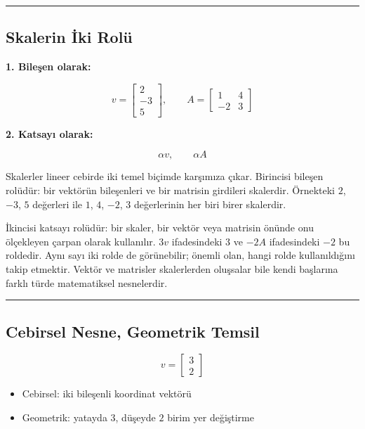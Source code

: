 \documentclass[
  a4paper,
  DIV=11,
  numbers=noendperiod]{scrartcl}
\providecommand{\tightlist}{%
  \setlength{\itemsep}{0pt}\setlength{\parskip}{0pt}}
\begin{document}
\begin{center}\rule{0.5\linewidth}{0.5pt}\end{center}

\subsection{Skalerin İki Rolü}\label{skalerin-iki-roluxfc}

\textbf{1. Bileşen olarak:}

\[
v=\begin{bmatrix}2\\-3\\5\end{bmatrix},
\qquad
A=\begin{bmatrix}1&4\\-2&3\end{bmatrix}
\]

\textbf{2. Katsayı olarak:}

\[
\alpha v,\qquad \alpha A
\]

Skalerler lineer cebirde iki temel biçimde karşımıza çıkar. Birincisi
bileşen rolüdür: bir vektörün bileşenleri ve bir matrisin girdileri
skalerdir. Örnekteki \(2\), \(-3\), \(5\) değerleri ile \(1\), \(4\),
\(-2\), \(3\) değerlerinin her biri birer skalerdir.

İkincisi katsayı rolüdür: bir skaler, bir vektör veya matrisin önünde
onu ölçekleyen çarpan olarak kullanılır. \(3v\) ifadesindeki \(3\) ve
\(-2A\) ifadesindeki \(-2\) bu roldedir. Aynı sayı iki rolde de
görünebilir; önemli olan, hangi rolde kullanıldığını takip etmektir.
Vektör ve matrisler skalerlerden oluşsalar bile kendi başlarına farklı
türde matematiksel nesnelerdir.

\begin{center}\rule{0.5\linewidth}{0.5pt}\end{center}

\subsection{Cebirsel Nesne, Geometrik
Temsil}\label{cebirsel-nesne-geometrik-temsil}

\[
v=\begin{bmatrix}3\\2\end{bmatrix}
\]

\begin{itemize}
\tightlist
\item
  Cebirsel: iki bileşenli koordinat vektörü
\item
  Geometrik: yatayda \(3\), düşeyde \(2\) birim yer değiştirme
\end{itemize}
\end{document}
